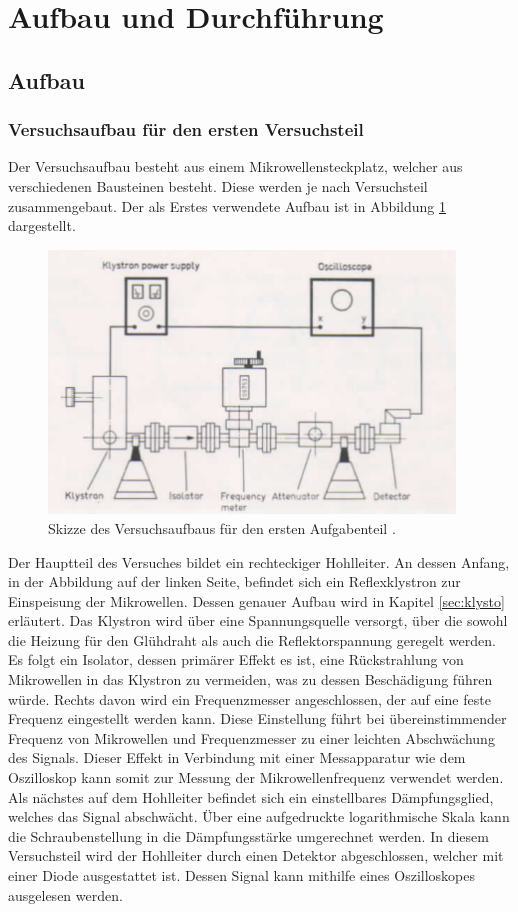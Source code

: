 \section{Aufbau und Durchführung}
\subsection{Aufbau}
\label{sec:Aufbau}

\subsubsection{Versuchsaufbau für den ersten Versuchsteil}
\label{sec:aufbau1}

Der Versuchsaufbau besteht aus einem Mikrowellensteckplatz, welcher aus verschiedenen Bausteinen besteht.
Diese werden je nach Versuchsteil zusammengebaut.
Der als Erstes verwendete Aufbau ist in Abbildung \ref{fig:aufbau1} dargestellt.

\begin{figure}
  \centering
  \includegraphics[height=7cm]{ressources/aufbau1.png}
  \caption{Skizze des Versuchsaufbaus für den ersten Aufgabenteil \cite{skript}.}
  \label{fig:aufbau1}
\end{figure}

Der Hauptteil des Versuches bildet ein rechteckiger Hohlleiter.
An dessen Anfang, in der Abbildung auf der linken Seite, befindet sich ein Reflexklystron zur Einspeisung der Mikrowellen.
Dessen genauer Aufbau wird in Kapitel \ref{sec:klysto} erläutert.
Das Klystron wird über eine Spannungsquelle versorgt, über die sowohl die Heizung für den Glühdraht als auch die Reflektorspannung geregelt werden.
Es folgt ein Isolator, dessen primärer Effekt es ist, eine Rückstrahlung von Mikrowellen in das Klystron zu vermeiden, was zu dessen Beschädigung führen würde.
Rechts davon wird ein Frequenzmesser angeschlossen, der auf eine feste Frequenz eingestellt werden kann.
Diese Einstellung führt bei übereinstimmender Frequenz von Mikrowellen und Frequenzmesser zu einer leichten Abschwächung des Signals.
Dieser Effekt in Verbindung mit einer Messapparatur wie dem Oszilloskop kann somit zur Messung der Mikrowellenfrequenz verwendet werden.
Als nächstes auf dem Hohlleiter befindet sich ein einstellbares Dämpfungsglied, welches das Signal abschwächt.
Über eine aufgedruckte logarithmische Skala kann die Schraubenstellung in die Dämpfungsstärke umgerechnet werden.
In diesem Versuchsteil wird der Hohlleiter durch einen Detektor abgeschlossen, welcher mit einer Diode ausgestattet ist.
Dessen Signal kann mithilfe eines Oszilloskopes ausgelesen werden.

